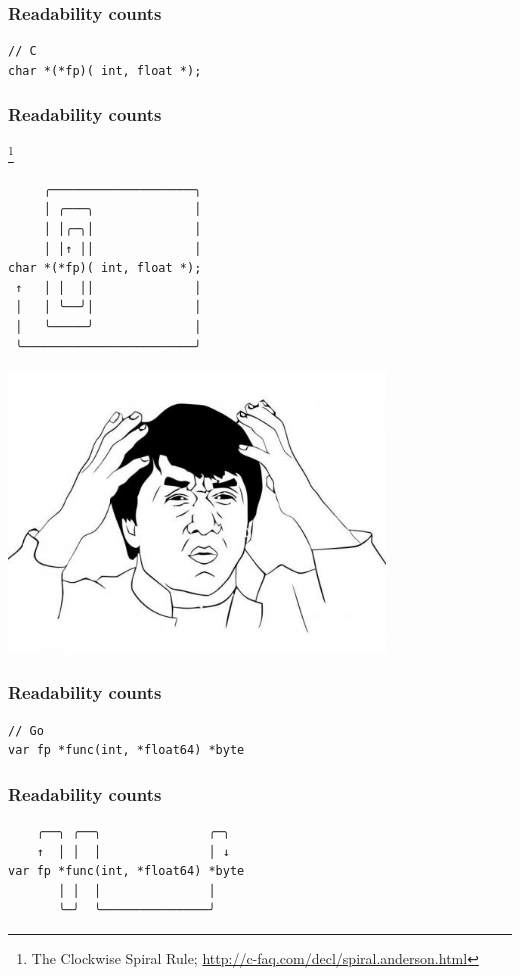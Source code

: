 \documentclass[xelatex,aspectratio=169]{beamer}
\begin{document}
{
\renewcommand{\fcolorbox}[4][]{#4}
\begin{frame}[fragile]
	\frametitle{Readability counts}
\begin{verbatim}
// C
char *(*fp)( int, float *);
\end{verbatim}
\end{frame}
\begin{frame}[fragile]
	\frametitle{Readability counts}
	\let\thefootnote\relax
	\footnote{The Clockwise Spiral Rule; \url{http://c-faq.com/decl/spiral.anderson.html}}
	\setlength{\lineskip}{0pt}
\begin{verbatim}
     ╭────────────────────╮
     │ ╭───╮              │
     │ │╭─╮│              │
     │ │↑ ││              │
char *(*fp)( int, float *);
 ↑   │ │  ││              │
 │   │ ╰──╯│              │
 │   ╰─────╯              │
 ╰────────────────────────╯
\end{verbatim}
\end{frame}
\begin{frame}
\centerline{\includegraphics[width=0.75\textwidth]{images/jackie.jpg}}
\end{frame}
\begin{frame}[fragile]
	\frametitle{Readability counts}
\begin{verbatim}
// Go
var fp *func(int, *float64) *byte
\end{verbatim}
\end{frame}
\begin{frame}[fragile]
	\frametitle{Readability counts}
	\setlength{\lineskip}{0pt}
\begin{verbatim}
    ╭──╮ ╭──╮               ╭─╮
    ↑  │ │  │               │ ↓
var fp *func(int, *float64) *byte
       │ │  │               │
       ╰─╯  ╰───────────────╯
\end{verbatim}
\end{frame}
}
\end{document}
